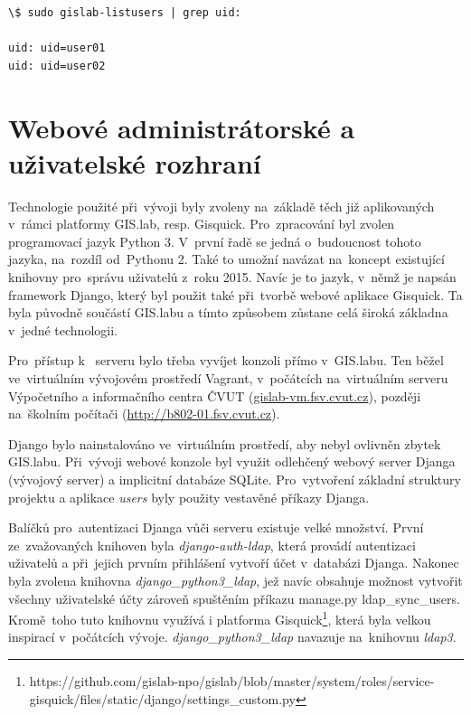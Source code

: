 \begin{verbatim}
\$ sudo gislab-listusers | grep uid:

uid: uid=user01
uid: uid=user02
\end{verbatim}

\section{Webové administrátorské a uživatelské rozhraní}
\label{web-console}
Technologie použité při~vývoji byly zvoleny na~základě těch již
aplikovaných v~rámci platformy GIS.lab, resp. Gisquick. Pro~zpracování
byl zvolen programovací jazyk Python 3. V~první řadě se jedná 
o~budoucnost tohoto jazyka, na~rozdíl od~Pythonu 2. Také to umožní
navázat na~koncept existující knihovny pro~správu uživatelů z~roku
2015. Navíc je to jazyk, v~němž je napsán framework Django, který byl
použit také při~tvorbě webové aplikace Gisquick. Ta byla původně
součástí GIS.labu a tímto způsobem zůstane celá široká základna 
v~jedné technologii.

Pro~přístup k~ serveru bylo třeba vyvíjet konzoli přímo 
v~GIS.labu. Ten běžel ve~virtuálním vývojovém prostředí Vagrant, 
v~počátcích na~virtuálním serveru Výpočetního a informačního centra ČVUT
(\href{gislab-vm.fsv.cvut.cz}{gislab-vm.fsv.cvut.cz}), později 
na~školním počítači
(\href{http://b802-01.fsv.cvut.cz}{http://b802-01.fsv.cvut.cz}).

Django bylo nainstalováno ve~virtuálním prostředí, aby nebyl ovlivněn
zbytek GIS.labu. Při~vývoji webové konzole byl využit odlehčený webový
server Djanga (vývojový server) a implicitní databáze SQLite. 
Pro~vytvoření základní struktury projektu a aplikace \textit{users} byly
použity vestavěné příkazy Djanga.

Balíčků pro~autentizaci Djanga vůči  serveru existuje velké
množství. První ze~zvažovaných knihoven byla
\textit{django-auth-ldap}, která provádí autentizaci uživatelů a 
při~jejich prvním přihlášení vytvoří účet v~databázi Djanga. Nakonec byla
zvolena knihovna \textit{django\_python3\_ldap}, jež navíc obsahuje
možnost vytvořit všechny uživatelské účty zároveň spuštěním příkazu
\textsf{manage.py ldap\_sync\_users}. Kromě~toho tuto knihovnu využívá
i platforma
Gisquick\footnote{https://github.com/gislab-npo/gislab/blob/master/system/roles/service-gisquick/files/static/django/settings\_custom.py},
která byla velkou inspirací v~počátcích
vývoje. \textit{django\_python3\_ldap} navazuje na~knihovnu
\textit{ldap3}.

